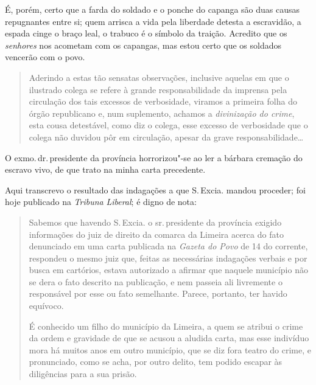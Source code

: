 É, porém, certo que a farda do soldado e o ponche do capanga são duas
causas repugnantes entre si; quem arrisca a vida pela liberdade detesta
a escravidão, a espada cinge o braço leal, o trabuco é o símbolo da
traição. Acredito que os \emph{senhores} nos acometam com os capangas,
mas estou certo que os soldados vencerão com o povo.


\begin{quote}
Aderindo a estas tão sensatas observações, inclusive aquelas em que o
ilustrado colega se refere à grande responsabilidade da imprensa pela
circulação dos tais excessos de verbosidade, viramos a primeira folha do
órgão republicano e, num suplemento, achamos a \emph{divinização do
crime}, esta cousa detestável, como diz o colega, esse excesso de
verbosidade que o colega não duvidou pôr em circulação, apesar da grave
responsabilidade\ldots{}
\end{quote}

O exmo.\,dr.\,presidente da província horrorizou"-se ao ler a bárbara
cremação do escravo vivo, de que trato na minha carta precedente.

Aqui transcrevo o resultado das indagações a que S.\,Excia. mandou
proceder; foi hoje publicado na \emph{Tribuna} \emph{Liberal}; é digno
de nota:

\begin{quote}
Sabemos que havendo S.\,Excia. o sr.\,presidente da província exigido
informações do juiz de direito da comarca da Limeira acerca do
fato denunciado em uma carta publicada na \emph{Gazeta do Povo} de 14 do
corrente, respondeu o mesmo juiz que, feitas as necessárias indagações
verbais e por busca em cartórios, estava autorizado a afirmar que
naquele município não se dera o fato descrito na publicação, e nem
passeia ali livremente o responsável por esse ou fato semelhante.
Parece, portanto, ter havido equívoco.

É conhecido um filho do município da Limeira, a quem se atribui o crime
da ordem e gravidade de que se acusou a aludida carta, mas esse
indivíduo mora há muitos anos em outro município, que se diz fora teatro
do crime, e pronunciado, como se acha, por outro delito, tem podido
escapar às diligências para a sua prisão.
\end{quote}

